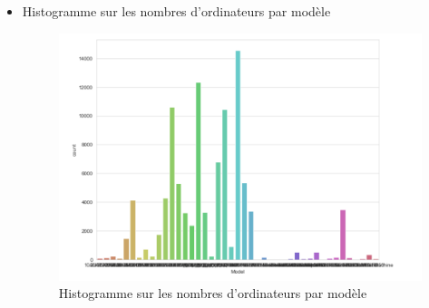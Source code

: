 \begin{itemize}[label=\textbullet, font=\LARGE \color{black}]
\newpage
\item Histogramme sur les nombres d'ordinateurs par modèle
\newline
\begin{figure}[h]
\begin{center}
\includegraphics[scale=0.80]{Dataviz_model_count.png}
\caption[Histogramme sur les nombres d'ordinateur spar modèle]{Histogramme sur les nombres d'ordinateurs par modèle}
\label{monlabel}
\end{center}
\end{figure}


\end{itemize}
